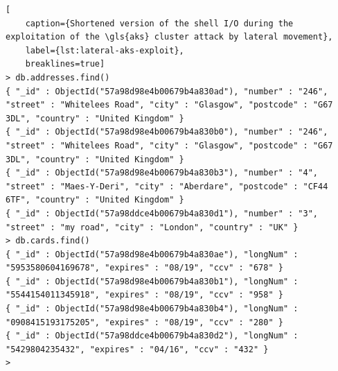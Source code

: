\begin{lstlisting}[
	caption={Shortened version of the shell I/O during the exploitation of the \gls{aks} cluster attack by lateral movement},
	label={lst:lateral-aks-exploit},
	breaklines=true]
> db.addresses.find()
{ "_id" : ObjectId("57a98d98e4b00679b4a830ad"), "number" : "246", "street" : "Whitelees Road", "city" : "Glasgow", "postcode" : "G67 3DL", "country" : "United Kingdom" }
{ "_id" : ObjectId("57a98d98e4b00679b4a830b0"), "number" : "246", "street" : "Whitelees Road", "city" : "Glasgow", "postcode" : "G67 3DL", "country" : "United Kingdom" }
{ "_id" : ObjectId("57a98d98e4b00679b4a830b3"), "number" : "4", "street" : "Maes-Y-Deri", "city" : "Aberdare", "postcode" : "CF44 6TF", "country" : "United Kingdom" }
{ "_id" : ObjectId("57a98ddce4b00679b4a830d1"), "number" : "3", "street" : "my road", "city" : "London", "country" : "UK" }
> db.cards.find()
{ "_id" : ObjectId("57a98d98e4b00679b4a830ae"), "longNum" : "5953580604169678", "expires" : "08/19", "ccv" : "678" }
{ "_id" : ObjectId("57a98d98e4b00679b4a830b1"), "longNum" : "5544154011345918", "expires" : "08/19", "ccv" : "958" }
{ "_id" : ObjectId("57a98d98e4b00679b4a830b4"), "longNum" : "0908415193175205", "expires" : "08/19", "ccv" : "280" }
{ "_id" : ObjectId("57a98ddce4b00679b4a830d2"), "longNum" : "5429804235432", "expires" : "04/16", "ccv" : "432" }
>
\end{lstlisting}

